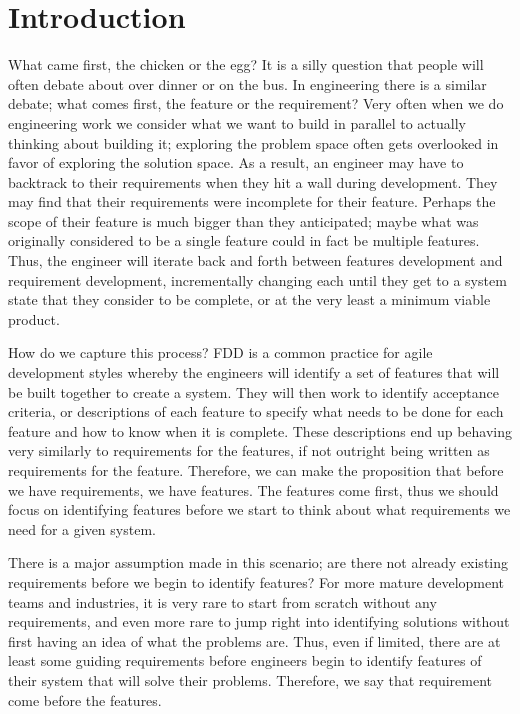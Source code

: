 \chapter{Introduction}

What came first, the chicken or the egg? It is a silly question that people will often debate about over dinner or on the bus. In engineering there is a similar debate; what comes first, the feature or the requirement? Very often when we do engineering work we consider what we want to build in parallel to actually thinking about building it; exploring the problem space often gets overlooked in favor of exploring the solution space. As a result, an engineer may have to backtrack to their requirements when they hit a wall during development. They may find that their requirements were incomplete for their feature. Perhaps the scope of their feature is much bigger than they anticipated; maybe what was originally considered to be a single feature could in fact be multiple features. Thus, the engineer will iterate back and forth between features development and requirement development, incrementally changing each until they get to a system state that they consider to be complete, or at the very least a minimum viable product. 

How do we capture this process? \ac{FDD} is a common practice for agile development styles whereby the engineers will identify a set of features that will be built together to create a system. They will then work to identify acceptance criteria, or descriptions of each feature to specify what needs to be done for each feature and how to know when it is complete. These descriptions end up behaving very similarly to requirements for the features, if not outright being written as requirements for the feature. Therefore, we can make the proposition that before we have requirements, we have features. The features come first, thus we should focus on identifying features before we start to think about what requirements we need for a given system.

There is a major assumption made in this scenario; are there not already existing requirements before we begin to identify features? For more mature development teams and industries, it is very rare to start from scratch without any requirements, and even more rare to jump right into identifying solutions without first having an idea of what the problems are. Thus, even if limited, there are at least some guiding requirements before engineers begin to identify features of their system that will solve their problems. Therefore, we say that requirement come before the features. 

